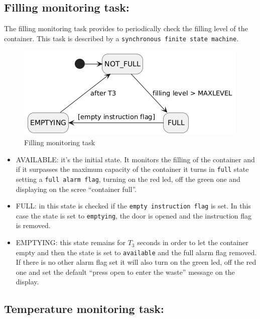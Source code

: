 \documentclass[a4paper,12pt]{report}
\begin{document}
        \subsection{Filling monitoring task:}

            The filling monitoring task provides to periodically check the filling level of the container.
            This task is described by a \texttt{synchronous finite state machine}. 

            \begin{figure}[H]
        	\centering{}
                \includegraphics[width=\textwidth]{img/filling_task.png}
        	\caption{Filling monitoring task}
        	\label{img:filling_task}
            \end{figure}

            \begin{itemize}
                \item AVAILABLE: it's the initial state. It monitors the filling of the container and if it surpasses the maximum capacity of the container it turns in \texttt{full} state setting a \texttt{full alarm flag}, turning on the red led, off the green one and displaying on the scree ``container full''.
                \item FULL: in this state is checked if the \texttt{empty instruction flag} is set. In this case the state is set to \texttt{emptying}, the door is opened and the instruction flag is removed.
                \item EMPTYING: this state remains for $T_3$ seconds in order to let the container empty and then the state is set to \texttt{available} and the full alarm flag removed. If there is no other alarm flag set it will also turn on the green led, off the red one and set the default ``press open to enter the waste'' message on the display.
            \end{itemize}
        
        \subsection{Temperature monitoring task:}
\end{document}
